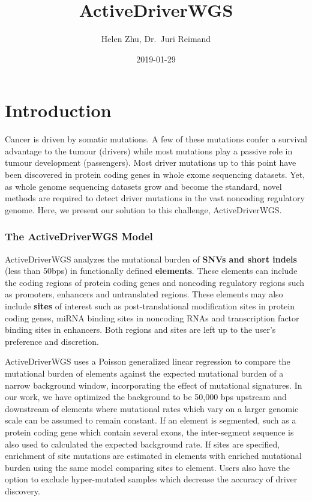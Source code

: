 \documentclass[]{article}
\title{ActiveDriverWGS}
\author{Helen Zhu, Dr.~Juri Reimand}
\date{2019-01-29}
\begin{document}
\maketitle

\section{Introduction}\label{introduction}

Cancer is driven by somatic mutations. A few of these mutations confer a
survival advantage to the tumour (drivers) while most mutations play a
passive role in tumour development (passengers). Most driver mutations
up to this point have been discovered in protein coding genes in whole
exome sequencing datasets. Yet, as whole genome sequencing datasets grow
and become the standard, novel methods are required to detect driver
mutations in the vast noncoding regulatory genome. Here, we present our
solution to this challenge, ActiveDriverWGS.

\subsubsection{The ActiveDriverWGS
Model}\label{the-activedriverwgs-model}

ActiveDriverWGS analyzes the mutational burden of \textbf{SNVs and short
indels} (less than 50bps) in functionally defined \textbf{elements}.
These elements can include the coding regions of protein coding genes
and noncoding regulatory regions such as promoters, enhancers and
untranslated regions. These elements may also include \textbf{sites} of
interest such as post-translational modification sites in protein coding
genes, miRNA binding sites in noncoding RNAs and transcription factor
binding sites in enhancers. Both regions and sites are left up to the
user's preference and discretion.

\newline
ActiveDriverWGS uses a Poisson generalized linear regression to compare
the mutational burden of elements against the expected mutational burden
of a narrow background window, incorporating the effect of mutational
signatures. In our work, we have optimized the background to be 50,000
bps upstream and downstream of elements where mutational rates which
vary on a larger genomic scale can be assumed to remain constant. If an
element is segmented, such as a protein coding gene which contain
several exons, the inter-segment sequence is also used to calculated the
expected background rate. If sites are specified, enrichment of site
mutations are estimated in elements with enriched mutational burden
using the same model comparing sites to element. Users also have the
option to exclude hyper-mutated samples which decrease the accuracy of
driver discovery.
\end{document}

